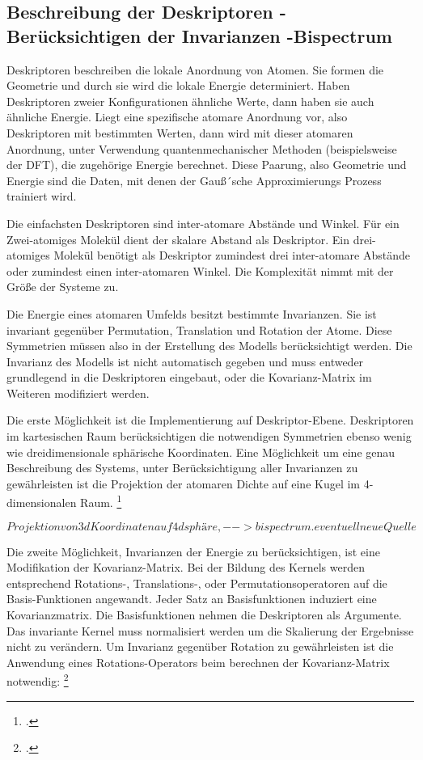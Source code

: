 \subsection{Beschreibung der Deskriptoren - Berücksichtigen der Invarianzen -Bispectrum}
Deskriptoren beschreiben die lokale Anordnung von Atomen. Sie formen die Geometrie und durch sie wird die lokale Energie determiniert. Haben Deskriptoren zweier Konfigurationen ähnliche Werte, dann haben sie auch ähnliche Energie. Liegt eine spezifische atomare Anordnung vor, also Deskriptoren mit bestimmten Werten, dann wird mit dieser atomaren Anordnung, unter Verwendung quantenmechanischer Methoden (beispielsweise der DFT), die zugehörige Energie berechnet. Diese Paarung, also Geometrie und Energie sind die Daten, mit denen der Gauß´sche Approximierungs Prozess trainiert wird. 

Die einfachsten Deskriptoren sind inter-atomare Abstände und Winkel. Für ein Zwei-atomiges Molekül dient der skalare Abstand als Deskriptor. Ein drei-atomiges Molekül benötigt als Deskriptor zumindest drei inter-atomare Abstände oder zumindest einen inter-atomaren Winkel. Die Komplexität nimmt mit der Größe der Systeme zu. 

Die Energie eines atomaren Umfelds besitzt bestimmte Invarianzen. Sie ist invariant gegenüber Permutation, Translation und Rotation der Atome. Diese Symmetrien müssen also in der Erstellung des Modells berücksichtigt werden. Die Invarianz des Modells ist nicht automatisch gegeben und muss entweder grundlegend in die Deskriptoren eingebaut, oder die Kovarianz-Matrix im Weiteren modifiziert werden. 



Die erste Möglichkeit ist die Implementierung auf Deskriptor-Ebene. Deskriptoren im kartesischen Raum berücksichtigen die notwendigen Symmetrien ebenso wenig wie dreidimensionale sphärische Koordinaten. Eine Möglichkeit um eine genau Beschreibung des Systems, unter Berücksichtigung aller Invarianzen zu gewährleisten ist die Projektion der atomaren Dichte auf eine Kugel im 4-dimensionalen Raum. \footcite[3]{GAP-2009}

$$ Projektion von 3d Koordinaten auf 4d sphäre, --> bispectrum. eventuell neue Quelle$$

Die zweite Möglichkeit, Invarianzen der Energie zu berücksichtigen, ist eine Modifikation der Kovarianz-Matrix. Bei der Bildung des Kernels werden entsprechend Rotations-, Translations-, oder Permutationsoperatoren auf die Basis-Funktionen angewandt. Jeder Satz an Basisfunktionen induziert eine Kovarianzmatrix. Die Basisfunktionen nehmen die Deskriptoren als Argumente. Das invariante Kernel muss normalisiert werden um die Skalierung der Ergebnisse nicht zu verändern. Um Invarianz gegenüber Rotation zu gewährleisten ist die Anwendung eines Rotations-Operators beim berechnen der Kovarianz-Matrix notwendig: \footcite[1055]{GAP-intro}


